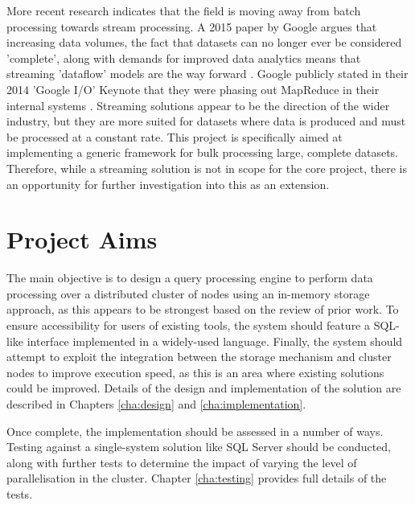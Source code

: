 More recent research indicates that the field is moving away from batch processing towards stream processing. A 2015 paper by Google argues that increasing data volumes, the fact that datasets can no longer ever be considered 'complete', along with demands for improved data analytics means that streaming 'dataflow' models are the way forward  \cite{akidau2015dataflow}. Google publicly stated in their 2014 'Google I/O' Keynote that they were phasing out MapReduce in their internal systems \cite{googleio2014}. 
Streaming solutions appear to be the direction of the wider industry, but they are more suited for datasets where data is produced and must be processed at a constant rate. This project is specifically aimed at implementing a generic framework for bulk processing large, complete datasets. Therefore, while a streaming solution is not in scope for the core project, there is an opportunity for further investigation into this as an extension.

\section{Project Aims}
The main objective is to design a query processing engine to perform data processing over a distributed cluster of nodes using an in-memory storage approach, as this appears to be strongest based on the review of prior work. To ensure accessibility for users of existing tools, the system should feature a SQL-like interface implemented in a widely-used language. Finally, the system should attempt to exploit the integration between the storage mechanism and cluster nodes to improve execution speed, as this is an area where existing solutions could be improved. Details of the design and implementation of the solution are described in Chapters \ref{cha:design} and \ref{cha:implementation}.

Once complete, the implementation should be assessed in a number of ways. Testing against a single-system solution like SQL Server should be conducted, along with further tests to determine the impact of varying the level of parallelisation in the cluster. Chapter \ref{cha:testing} provides full details of the tests.

